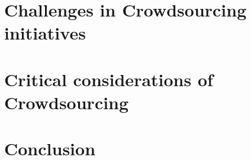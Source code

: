 \documentclass{sig-alternate}
\begin{document}
\section{Challenges in Crowdsourcing initiatives}

\section{Critical considerations of Crowdsourcing}
%

\section{Conclusion}

\nocite{*}


\end{document}
